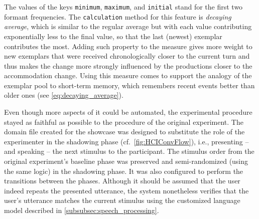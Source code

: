 \noindent
The values of the keys \texttt{minimum}, \texttt{maximum}, and \texttt{initial} stand for the first two formant frequencies.
The \texttt{calculation} method for this feature is \emph{decaying average}, which is similar to the regular average but with each value contributing exponentially less to the final value, so that the last (newest) exemplar contributes the most.
Adding such property to the measure gives more weight to new exemplars that were received chronologically closer to the current turn and thus makes the change more strongly influenced by the productions closer to the accommodation change.
Using this measure comes to support the analogy of the exemplar pool to short-term memory, which remembers recent events better than older ones (see \cref{eq:decaying_average}).

Even though more aspects of it could be automated, the experimental procedure stayed as faithful as possible to the procedure of the original experiment.
The domain file created for the showcase was designed to substitute the role of the experimenter in the shadowing phase (cf.\ \cref{fig:HCIConvFlow}), i.e., presenting -- and speaking -- the next stimulus to the participant.
The stimulus order from the original experiment's baseline phase was preserved and semi-randomized (using the same logic) in the shadowing phase.
It was also configured to perform the transitions between the phases.
Although it should be assumed that the user indeed repeats the presented utterance, the system nonetheless verifies that the user's utterance matches the current stimulus using the customized language model described in \cref{subsubsec:speech_processing}.


